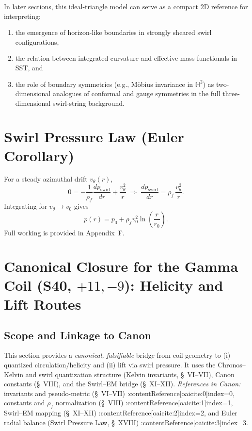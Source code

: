 \documentclass[10pt,reprint,aps,onecolumn,nofootinbib]{revtex4-2}
\newcommand{\rhof}{\rho_{\!f}}                           %
\begin{document}
        In later sections, this ideal-triangle model can serve as a compact 2D reference for interpreting:
        \begin{enumerate}
            \item the emergence of horizon-like boundaries in strongly sheared swirl configurations,
            \item the relation between integrated curvature and effective mass functionals in SST, and
            \item the role of boundary symmetries (e.g., M\"obius invariance in $\mathbb{H}^2$) as two-dimensional analogues of conformal and gauge symmetries in the full three-dimensional swirl-string background.
        \end{enumerate}

    \section{Swirl Pressure Law (Euler Corollary)}\label{canon58:pressure}
    For a steady azimuthal drift $v_\theta(r)$,
    \[
        0=-\frac{1}{\rhof}\frac{dp_{\text{swirl}}}{dr}+\frac{v_\theta^2}{r}
        \;\Rightarrow\;
        \frac{dp_{\text{swirl}}}{dr}=\rhof\,\frac{v_\theta^2}{r}.
    \]
    Integrating for $v_\theta\to v_0$ gives
    \[
        p(r)=p_0+\rhof v_0^2\ln\!\left(\frac{r}{r_0}\right).
    \]
    Full working is provided in Appendix~F.



    \section{Canonical Closure for the Gamma Coil (S40, $+11,-9$): Helicity and Lift Routes}
    \label{sec:GammaCoilClosure}

    \subsection*{Scope and Linkage to Canon}
        This section provides a \emph{canonical, falsifiable} bridge from coil geometry to (i) quantized circulation/helicity and (ii) lift via swirl pressure. It uses the Chronos--Kelvin and swirl quantization structure (Kelvin invariants, \S~VI--VII), Canon constants (\S~VIII), and the Swirl--EM bridge (\S~XI--XII). %
        \emph{References in Canon:} invariants and pseudo-metric (\S~VI--VII) :contentReference[oaicite:0]{index=0}, constants and $\rho_{\!f}$ normalization (\S~VIII) :contentReference[oaicite:1]{index=1}, Swirl--EM mapping (\S~XI--XII) :contentReference[oaicite:2]{index=2}, and Euler radial balance (Swirl Pressure Law, \S~XVIII) :contentReference[oaicite:3]{index=3}.
\end{document}
